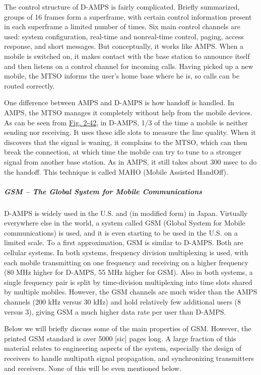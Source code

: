 The control structure of D-AMPS is fairly complicated. Briefly
summarized, groups of 16 frames form a superframe, with certain control
information present in each superframe a limited number of times. Six
main control channels are used: system configuration, real-time and
nonreal-time control, paging, access response, and short messages. But
conceptually, it works like AMPS. When a mobile is switched on, it makes
contact with the base station to announce itself and then listens on a
control channel for incoming calls. Having picked up a new mobile, the
MTSO informs the user's home base where he is, so calls can be routed
correctly.

One difference between AMPS and D-AMPS is how handoff is handled. In
AMPS, the MTSO manages it completely without help from the mobile
devices. As can be seen from
\protect\hyperlink{0130661023_ch02lev1sec6.htmlux5cux23ch02fig42}{Fig.
2-42}, in D-AMPS, 1/3 of the time a mobile is neither sending nor
receiving. It uses these idle slots to measure the line quality. When it
discovers that the signal is waning, it complains to the MTSO, which can
then break the connection, at which time the mobile can try to tune to a
stronger signal from another base station. As in AMPS, it still takes
about 300 msec to do the handoff. This technique is called {MAHO}
({Mobile Assisted HandOff}).

\protect\hypertarget{0130661023_ch02lev1sec6.htmlux5cux23ch02lev3sec23}{}{}

\subparagraph{GSM -- The Global System for Mobile Communications}

D-AMPS is widely used in the U.S. and (in modified form) in Japan.
Virtually everywhere else in the world, a system called {GSM} ({Global
System for Mobile communications}) is used, and it is even starting to
be used in the U.S. on a limited scale. To a first approximation, GSM is
similar to D-AMPS. Both are cellular systems. In both systems, frequency
division multiplexing is used, with each mobile transmitting on one
frequency and receiving on a higher frequency (80 MHz higher for D-AMPS,
55 MHz higher for GSM). Also in both systems, a single frequency pair is
split by time-division multiplexing into time slots shared by multiple
mobiles. However, the GSM channels are much wider than the AMPS channels
(200 kHz versus 30 kHz) and hold relatively few additional users (8
versus 3), giving GSM a much higher data rate per user than D-AMPS.

Below we will briefly discuss some of the main properties of GSM.
However, the printed GSM standard is over 5000 {[}sic{]} pages long. A
large fraction of this material relates to engineering aspects of the
system, especially the design of receivers to handle multipath signal
propagation, and synchronizing transmitters and receivers. None of this
will be even mentioned below.

